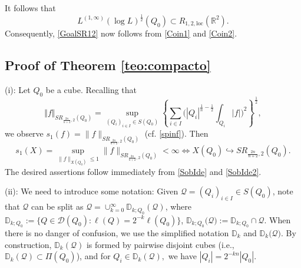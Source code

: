 \documentclass[11pt, a4paper,leqno]{amsart}
\theoremstyle{plain}
\numberwithin{equation}{section}
\theoremstyle{definition}
\theoremstyle{remark}
\begin{document}
It follows that
\begin{equation}
L^{(1,\infty)}(\log L)^{\frac{1}{2}}(Q_{0})\subset R_{1,2,\text{loc}%
}(\mathbb{R}^{2}).\label{Coin2}%
\end{equation}
Consequently, \eqref{GoalSR12} now follows from \eqref{Coin1} and \eqref{Coin2}.

\subsection{Proof of Theorem \ref{teo:compacto}\label{Section4.1}}



(i):  Let $Q_0$ be a cube. Recalling that
\begin{equation}
\Vert f\Vert_{SR_{\frac{2n}{n+2},2}(Q_{0})}=\sup_{(Q_{i})_{i\in I}\in
S(Q_{0})}\left\{  \sum_{i\in I}\bigg(|Q_{i}|^{\frac{1}{n}-\frac{1}{2}}%
\int_{Q_{i}}|f|\bigg)^{2}\right\}  ^{\frac{1}{2}},\label{Compactness3+}%
\end{equation}
we observe $s_1 (f) = \|f\|_{SR_{\frac{2 n}{n+2}, 2} (Q_0)}$ (cf. \eqref{spinf}). Then
$$
	s_1(X) = \sup_{\|f\|_{X(Q_0)} \leq 1}  \|f\|_{SR_{\frac{2 n}{n+2}, 2} (Q_0)} < \infty \iff X(Q_0) \hookrightarrow SR_{\frac{2 n}{n+2}, 2} (Q_0). 
$$
The desired assertions follow immediately from \eqref{SobIde} and \eqref{SobIde2}.






(ii): We need to introduce some notation: Given $\mathcal{Q}=(Q_{i})_{i\in
I}\in S(Q_{0})$, note that 
$\mathcal{Q}$ can be split as $\mathcal{Q}=\cup_{k=0}^{\infty}\mathbb{D}%
_{k;Q_{0}}(\mathcal{Q})$, where $\mathbb{D}_{k;Q_{0}}:=\{Q \in \mathcal{D}(Q_{0}): \ell(Q) = 2^{-k}\ell(Q_{0})\}$,
$\mathbb{D}_{k; Q_0}(\mathcal{Q)}:=\mathbb{D}_{k;Q_{0}}\cap\mathcal{Q}$.  When there is no danger of confusion,  we use the simplified notation $\mathbb{D}_{k}$  and $\mathbb{D}_{k}(\mathcal{Q)}$. By construction, $\mathbb{D}_{k}(\mathcal{Q})$
is formed by pairwise disjoint cubes (i.e., $\mathbb{D}_{k}%
(\mathcal{Q})\subset\Pi(Q_{0})$), and for $Q_{i}\in\mathbb{D}_{k
}(\mathcal{Q}),$ we have $|Q_{i}|=2^{-kn}|Q_{0}|$.
\end{document}
